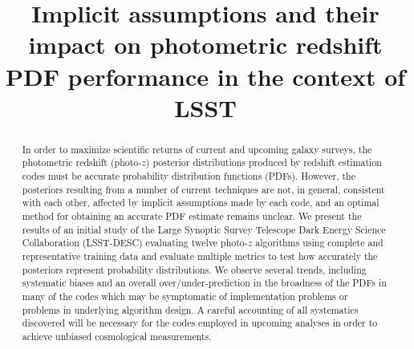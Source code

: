 \documentclass[\docopts]{\docclass}
\begin{document}
\linenumbers

\title{Implicit assumptions and their impact on photometric redshift PDF performance in the context of LSST}

\maketitlepre

\begin{abstract}

In order to maximize scientific returns of current and upcoming galaxy surveys, the photometric redshift (photo-$z$) posterior distributions produced by redshift estimation codes must be accurate probability distribution functions (PDFs).  However, the posteriors resulting from a number of current techniques are not, in general, consistent with each other, affected by implicit assumptions made by each code, and an optimal method for obtaining an accurate PDF estimate remains unclear.   We present the results of an initial study of the Large Synoptic Survey Telescope Dark Energy Science Collaboration (\textsc{LSST-DESC}) evaluating twelve photo-$z$ algorithms using complete and representative training data and evaluate multiple metrics to test how accurately the posteriors represent probability distributions.  We observe several trends, including systematic biases and an overall over/under-prediction in the broadness of the PDFs in many of the codes which may be symptomatic of implementation problems or problems in underlying algorithm design.  A careful accounting of all systematics discovered will be necessary for the codes employed in upcoming analyses in order to achieve unbiased cosmological measurements.
  

\end{abstract}
\end{document}
